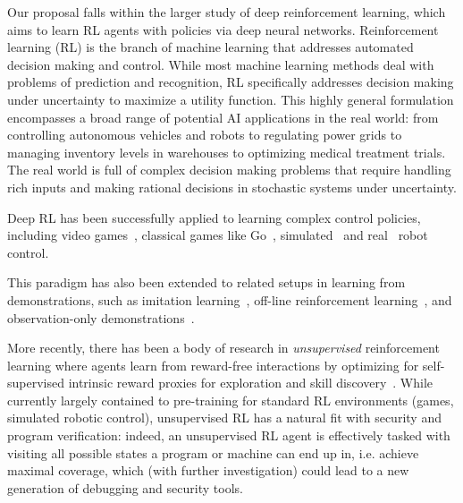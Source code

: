 \documentclass{NSF}
\begin{document}
Our proposal falls within the larger study of deep reinforcement learning, which aims to learn RL agents with policies via deep neural networks.
Reinforcement learning (RL) is the branch of machine learning that addresses automated decision making and control.
While most machine learning methods deal with problems of prediction and recognition, RL specifically addresses decision making under uncertainty to maximize a utility function.
This highly general formulation encompasses a broad range of potential AI applications in the real world: from controlling autonomous vehicles and robots to regulating power grids to managing inventory levels in warehouses to optimizing medical treatment trials.
The real world is full of complex decision making problems that require handling rich inputs and making rational decisions in stochastic systems under uncertainty.

Deep RL has been successfully applied to learning complex control policies, including video games~\cite{mnih2015human,openai2018dota,arulkumaran2017deep}, classical games like Go~\cite{silver2017alphago}, simulated~\cite{schulman2015trust,lillicrap2015continuous} and real~\cite{levine2016end,kalashnikov2018qt,openai2019solving,nagabandi2019deep} robot control.

This paradigm has also been extended to related setups in learning from demonstrations, such as imitation learning~\cite{ho2016generative,finn2016connection,kuefler2017imitating,fu2017learning}, off-line reinforcement learning~\cite{fujimoto2019off,kumar2019stabilizing,kumar2020conservative,kidambi2020morel,levine2020offline,yu2020mopo}, and observation-only demonstrations~\cite{liu2017imitation,torabi2018generative}.

More recently, there has been a body of research in \textit{unsupervised} reinforcement learning where agents learn from reward-free interactions by optimizing for self-supervised intrinsic reward proxies for exploration and skill discovery~\cite{pathakICMl17curiosity,pathak2019self,eysenbach2018diversity,hansen2019fast, sharma2019dynamics,liu2021aps,liu2021behavior,yarats2021reinforcement}.
While currently largely contained to pre-training for standard RL environments (games, simulated robotic control), unsupervised RL has a natural fit with security and program verification: indeed, an unsupervised RL agent is effectively tasked with visiting all possible states a program or machine can end up in, i.e. achieve maximal coverage, which (with further investigation) could lead to a new generation of debugging and security tools.
\end{document}
